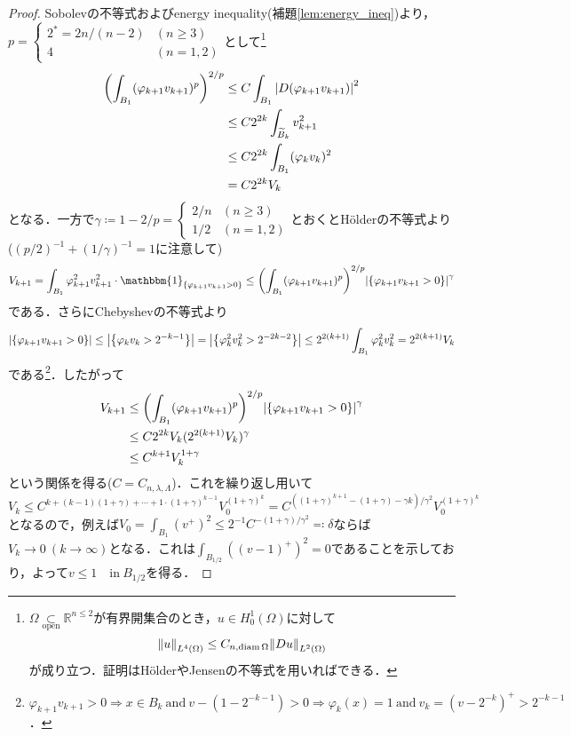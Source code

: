 \documentclass[a4paper]{ltjsarticle}
\newcommand{\Rset}{\mathbb{R}}
\newcommand{\opensub}{\underset{\text{open}}{\subset}}
\newcommand{\Om}{\Omega}
\newcommand{\inn}{\quad\text{in}\ }
\newcommand{\1}{\mathbbm{1}}
\DeclareMathOperator{\diam}{\mathrm{diam}}
\numberwithin{equation}{section}
\theoremstyle{definition}
\begin{document}
\begin{proof}
    Sobolevの不等式およびenergy inequality(補題\ref{lem:energy_ineq})より，$p=\begin{cases}
        2^\ast=2n/(n-2) & (n\geq3)\\
        4 & (n=1,2)
    \end{cases}$として\footnote{$\Om\opensub \Rset^{n\leq 2}$が有界開集合のとき，$u\in H^{1}_0(\Om)$に対して
    \begin{equation}
        \norm{u}_{L^4(\Om)}\leq C_{n,\diam\Om}\norm{Du}_{L^2(\Om)}
    \end{equation}
    が成り立つ．証明はHölderやJensenの不等式を用いればできる．}
    \begin{align}
        \qty(\int_{B_1}(\varphi_{k+1}v_{k+1})^p)^{2/p}&\leq C\int_{B_1}\abs{D(\varphi_{k+1}v_{k+1})}^2\\
        &\leq C2^{2k}\int_{\widetilde{B}_k}v_{k+1}^2\\
        &\leq C2^{2k}\int_{B_1}(\varphi_kv_k)^2\\
        &=C2^{2k}V_{k}
    \end{align}
    となる．一方で$\gamma\coloneqq 1-2/p=\begin{cases}
        2/n & (n\geq3)\\
        1/2 & (n=1,2)
    \end{cases}$とおくとHölderの不等式より($(p/2)^{-1}+(1/\gamma)^{-1}=1$に注意して)
    \begin{equation}
        V_{k+1}=\int_{B_1}\varphi_{k+1}^2 v_{k+1}^2\cdot \1_{\qty{\varphi_{k+1}v_{k+1}>0}}\leq \qty(\int_{B_1}(\varphi_{k+1}v_{k+1})^p)^{2/p}\abs{\qty{\varphi_{k+1}v_{k+1}>0}}^{\gamma}
    \end{equation}
    である．さらにChebyshevの不等式より
    \begin{equation}
        \abs{\qty{\varphi_{k+1}v_{k+1}>0}}\leq \abs{\qty{\varphi_kv_k>2^{-k-1}}}=\abs{\qty{\varphi_k^2v_k^2>2^{-2k-2}}}\leq 2^{2(k+1)}\int_{B_1}\varphi_k^2v_{k}^2=2^{2(k+1)}V_{k}
    \end{equation}
    である\footnote{$\varphi_{k+1}v_{k+1}>0\Rightarrow x\in B_k\ \text{and}\ v-(1-2^{-k-1})>0\Rightarrow \varphi_k(x)=1\ \text{and}\ v_{k}=(v-2^{-k})^+>2^{-k-1}$．}．したがって
    \begin{align}
        V_{k+1}&\leq \qty(\int_{B_1}(\varphi_{k+1}v_{k+1})^p)^{2/p}\abs{\qty{\varphi_{k+1}v_{k+1}>0}}^{\gamma}\\
        &\leq C2^{2k}V_{k}(2^{2(k+1)}V_{k})^{\gamma}\\
        &\leq C^{k+1}V_{k}^{1+\gamma}
    \end{align}
    という関係を得る($C=C_{n,\lambda,\Lambda}$)．これを繰り返し用いて
    \begin{equation}
        V_{k}\leq C^{k+(k-1)(1+\gamma)+\cdots+1\cdot(1+\gamma)^{k-1}}V_{0}^{(1+\gamma)^k}=C^{((1+\gamma)^{k+1}-(1+\gamma)-\gamma k)/\gamma^2}V_{0}^{(1+\gamma)^k}
    \end{equation}
    となるので，例えば$V_0=\int_{B_1}(v^+)^2\leq 2^{-1}C^{-(1+\gamma)/\gamma^2}\eqqcolon \delta$ならば$V_k\to0\ (k\to\infty)$となる．これは$\int_{B_{1/2}}((v-1)^+)^2=0$であることを示しており，よって$v\leq1\inn B_{1/2}$を得る．
\end{proof}
\end{document}
